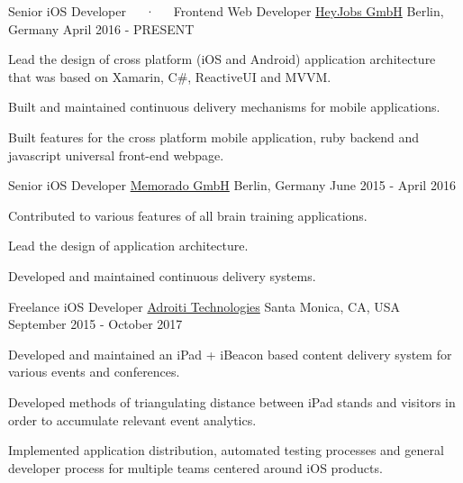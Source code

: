 

\begin{cventries}

  \cventry
    {Senior iOS Developer~~~·~~~Frontend Web Developer} %
    {\href{https://heyjobs.de}{HeyJobs GmbH}} %
    {Berlin, Germany} %
    {April 2016 - PRESENT} %
    {
      \begin{cvitems} %
        \item {Lead the design of cross platform (iOS and Android) application architecture that was based on Xamarin, C\#, ReactiveUI and MVVM.}
        \item {Built and maintained continuous delivery mechanisms for mobile applications.}
        \item {Built features for the cross platform mobile application, ruby backend and javascript universal front-end webpage.}
      \end{cvitems}
    }

  \cventry
    {Senior iOS Developer} %
    {\href{https://memorado.com}{Memorado GmbH}} %
    {Berlin, Germany} %
    {June 2015 - April 2016} %
    {
      \begin{cvitems} %
        \item {Contributed to various features of all brain training applications.}
        \item {Lead the design of application architecture.}
        \item {Developed and maintained continuous delivery systems.}
      \end{cvitems}
    }

  \cventry
    {Freelance iOS Developer} %
    {\href{https://www.adroiti.com}{Adroiti Technologies}} %
    {Santa Monica, CA, USA} %
    {September 2015 - October 2017} %
    {
       \begin{cvitems} %
         \item {Developed and maintained an iPad + iBeacon based content delivery system for various events and conferences.}
         \item {Developed methods of triangulating distance between iPad stands and visitors in order to accumulate relevant event analytics.}
         \item {Implemented application distribution, automated testing processes and general developer process for multiple teams centered around iOS products.}
       \end{cvitems}
    }


\end{cventries}

